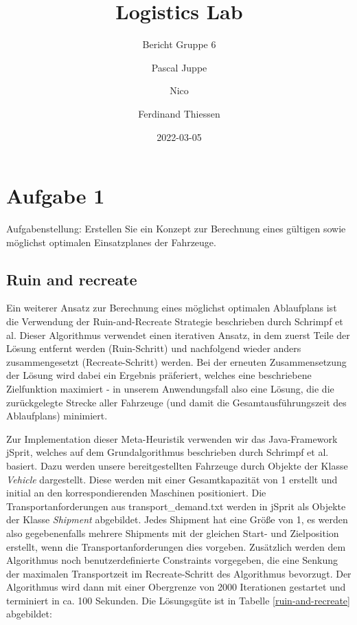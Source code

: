 \documentclass[ngerman]{tudscrreprt}
\begin{document}
\date{2022-03-05}
\author{%
Pascal Juppe%
%
\and%
Nico%
%
\and%
Ferdinand Thiessen%
%
}
\title{Logistics Lab}
\subtitle{Bericht Gruppe 6}
\maketitle


\tableofcontents

\chapter{Aufgabe 1}
Aufgabenstellung: Erstellen Sie ein Konzept zur Berechnung eines gültigen sowie möglichst optimalen Einsatzplanes der Fahrzeuge.

\section{Ruin and recreate}
Ein weiterer Ansatz zur Berechnung eines möglichst optimalen Ablaufplans ist die Verwendung der Ruin-and-Recreate Strategie beschrieben durch Schrimpf et al. \cite{schrimpf} Dieser Algorithmus verwendet einen iterativen Ansatz, in dem zuerst Teile der Lösung entfernt werden (Ruin-Schritt) und nachfolgend wieder anders zusammengesetzt (Recreate-Schritt) werden. Bei der erneuten Zusammensetzung der Lösung wird dabei ein Ergebnis präferiert, welches eine beschriebene Zielfunktion maximiert - in unserem Anwendungsfall also eine Lösung, die die zurückgelegte Strecke aller Fahrzeuge (und damit die Gesamtausführungszeit des Ablaufplans) minimiert.

Zur Implementation dieser Meta-Heuristik verwenden wir das Java-Framework jSprit, welches auf dem Grundalgorithmus beschrieben durch Schrimpf et al. basiert. Dazu werden unsere bereitgestellten Fahrzeuge durch Objekte der Klasse \textit{Vehicle} dargestellt. Diese werden mit einer Gesamtkapazität von 1 erstellt und initial an den korrespondierenden Maschinen positioniert. Die Transportanforderungen aus transport\_demand.txt werden in jSprit als Objekte der Klasse \textit{Shipment} abgebildet. Jedes Shipment hat eine Größe von 1, es werden also gegebenenfalls mehrere Shipments mit der gleichen Start- und Zielposition erstellt, wenn die Transportanforderungen dies vorgeben. Zusätzlich werden dem Algorithmus noch benutzerdefinierte Constraints vorgegeben, die eine Senkung der maximalen Transportzeit im Recreate-Schritt des Algorithmus bevorzugt. Der Algorithmus wird dann mit einer Obergrenze von 2000 Iterationen gestartet und terminiert in ca. 100 Sekunden. Die Lösungsgüte ist in Tabelle \ref{ruin-and-recreate} abgebildet:
\end{document}
